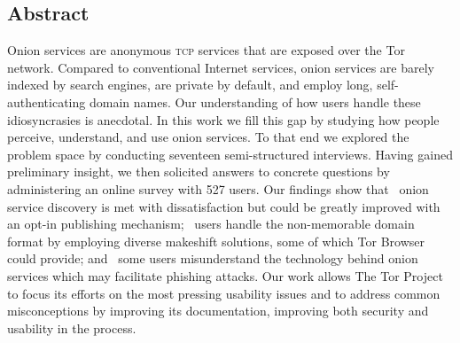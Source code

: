 \subsection*{Abstract}
Onion services are anonymous \textsc{tcp} services that are exposed over the Tor
network.  Compared to conventional Internet services, onion services are barely
indexed by search engines, are private by default, and employ long,
self-authenticating domain names.  Our understanding of how users handle these
idiosyncrasies is anecdotal.
In this work we fill this gap by studying how people perceive, understand, and
use onion services.  To that end we explored the problem space by conducting
seventeen semi-structured interviews.  Having gained preliminary insight, we
then solicited answers to concrete questions by administering an online survey with 527 users. Our findings show that \first~onion service
discovery is met with dissatisfaction but could be greatly improved with an
opt-in publishing mechanism; \second~users handle the non-memorable domain
format by employing diverse makeshift solutions, some of which Tor Browser could
provide; and \third~some users misunderstand the technology behind onion
services which may facilitate phishing attacks.
Our work allows The Tor Project to focus its efforts on the most pressing
usability issues and to address common misconceptions by improving its
documentation, improving both security and usability in the process.
